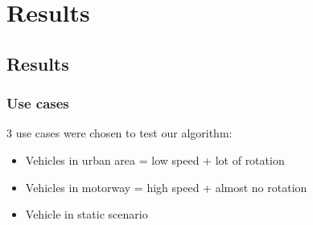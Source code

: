 \documentclass{beamer}
\begin{document}
\section{Results}

\subsection*{Results}

	\begin{frame}
		\frametitle{Use cases}
		3 use cases were chosen to test our algorithm:
		\begin{itemize}
		\item Vehicles in urban area =  low speed + lot of rotation
		\item Vehicles in motorway = high speed + almost no rotation
		\item Vehicle in static scenario
		\end{itemize}						
	\end{frame}
\end{document}
